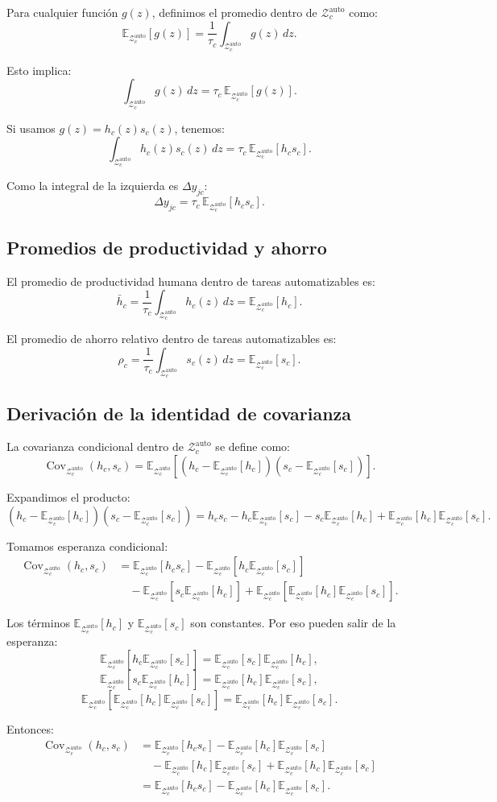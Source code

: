 \documentclass[11pt,a4paper]{article}
\newcommand{\Zauto}{\mathcal{Z}^{\mathrm{auto}}_c}
\newcommand{\Eauto}{\mathbb{E}_{\Zauto}}
\newcommand{\Covauto}{\operatorname{Cov}_{\Zauto}}
\newcommand{\dd}{\,dz}
\begin{document}
Para cualquier función \(g(z)\), definimos el promedio dentro de \(\Zauto\) como:
\[
\Eauto[g(z)]
=
\frac{1}{\tau_c}\int_{\Zauto}g(z)\dd.
\]

Esto implica:
\[
\int_{\Zauto}g(z)\dd=\tau_c\,\Eauto[g(z)].
\]

Si usamos \(g(z)=h_c(z)s_c(z)\), tenemos:
\[
\int_{\Zauto}h_c(z)s_c(z)\dd
=
\tau_c\,\Eauto[h_c s_c].
\]

Como la integral de la izquierda es \(\Delta y_{jc}\):
\[
\Delta y_{jc}
=
\tau_c\,\Eauto[h_c s_c].
\]

\subsection{Promedios de productividad y ahorro}

El promedio de productividad humana dentro de tareas automatizables es:
\[
\bar h_c
=
\frac{1}{\tau_c}\int_{\Zauto}h_c(z)\dd
=
\Eauto[h_c].
\]

El promedio de ahorro relativo dentro de tareas automatizables es:
\[
\rho_c
=
\frac{1}{\tau_c}\int_{\Zauto}s_c(z)\dd
=
\Eauto[s_c].
\]

\subsection{Derivación de la identidad de covarianza}

La covarianza condicional dentro de \(\Zauto\) se define como:
\[
\Covauto(h_c,s_c)
=
\Eauto\left[
\left(h_c-\Eauto[h_c]\right)
\left(s_c-\Eauto[s_c]\right)
\right].
\]

Expandimos el producto:
\[
\left(h_c-\Eauto[h_c]\right)
\left(s_c-\Eauto[s_c]\right)
=
h_c s_c
-h_c\Eauto[s_c]
-s_c\Eauto[h_c]
+\Eauto[h_c]\Eauto[s_c].
\]

Tomamos esperanza condicional:
\begin{align*}
\Covauto(h_c,s_c)
&=
\Eauto[h_c s_c]
-\Eauto[h_c\Eauto[s_c]]\\
&\quad
-\Eauto[s_c\Eauto[h_c]]
+\Eauto[\Eauto[h_c]\Eauto[s_c]].
\end{align*}

Los términos \(\Eauto[h_c]\) y \(\Eauto[s_c]\) son constantes. Por eso pueden salir de la esperanza:
\[
\Eauto[h_c\Eauto[s_c]]
=
\Eauto[s_c]\Eauto[h_c],
\]
\[
\Eauto[s_c\Eauto[h_c]]
=
\Eauto[h_c]\Eauto[s_c],
\]
\[
\Eauto[\Eauto[h_c]\Eauto[s_c]]
=
\Eauto[h_c]\Eauto[s_c].
\]

Entonces:
\begin{align*}
\Covauto(h_c,s_c)
&=
\Eauto[h_c s_c]
-\Eauto[h_c]\Eauto[s_c]\\
&\quad
-\Eauto[h_c]\Eauto[s_c]
+\Eauto[h_c]\Eauto[s_c]\\
&=
\Eauto[h_c s_c]
-\Eauto[h_c]\Eauto[s_c].
\end{align*}
\end{document}
